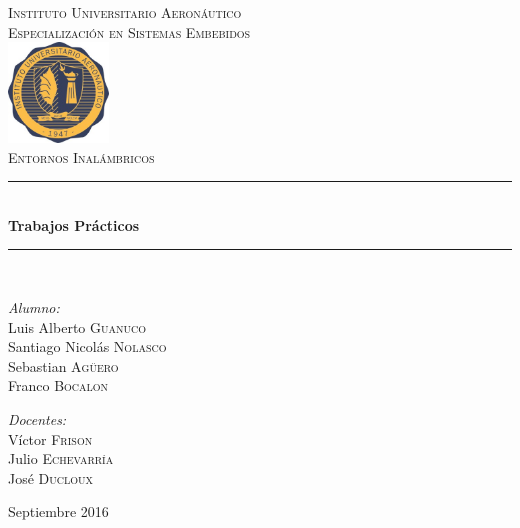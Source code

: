 \documentclass[11pt,oneside,spanish,a4paper]{article}
\newcommand{\HRule}{\rule{\linewidth}{0.5mm}}
\begin{document}

\begin{titlepage}
\begin{center}

\textsc{\LARGE Instituto Universitario Aeronáutico}\\[0.5cm]
\textsc{\LARGE Especialización en Sistemas Embebidos}\\[2cm]

\includegraphics[width=0.2\textwidth]{img/logo_f_blanco}~\\[2cm]

\textsc{\Large Entornos Inalámbricos}\\[0.5cm]

\HRule \\[0.4cm]
{ \huge \bfseries Trabajos Prácticos \\[0.4cm] }

\HRule \\[1.5cm]

\begin{minipage}{0.4\textwidth}
\begin{flushleft} \large
\emph{Alumno:}\\
Luis Alberto \textsc{Guanuco}\\
Santiago Nicolás \textsc{Nolasco}\\
Sebastian \textsc{Agüero}\\
Franco \textsc{Bocalon}
\end{flushleft}
\end{minipage}
\begin{minipage}{0.4\textwidth}
\begin{flushright} \large
\emph{Docentes:} \\
Víctor \textsc{Frison}\\
Julio \textsc{Echevarría}\\
José \textsc{Ducloux}
\end{flushright}
\end{minipage}
\vfill
{\large Septiembre 2016}

\end{center}
\end{titlepage}
\end{document}
